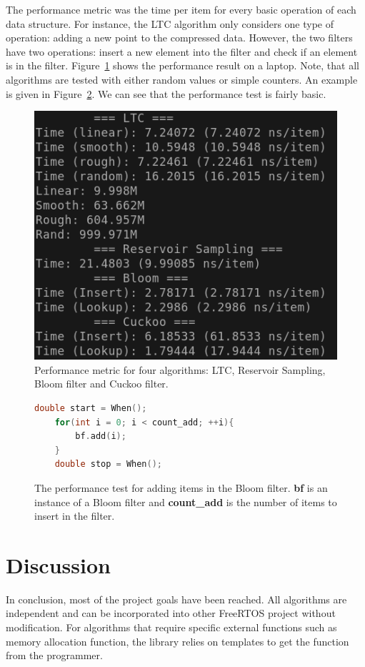 \documentclass{article}
\begin{document}
The performance metric was the time per item for every basic operation of each
data structure.  For instance, the LTC algorithm only considers one type of
operation: adding a new point to the compressed data.  However, the two filters
have two operations: insert a new element into the filter and check if an
element is in the filter.  Figure~\ref{fig:perf} shows the performance result
on a laptop.  Note, that all algorithms are tested with either random values or
simple counters.  An example is given in Figure~\ref{code:perf-bloom}.  We can
see that the performance test is fairly basic.
 
\begin{figure}
	\center
	\includegraphics[width=0.25\paperwidth]{perf.png}
	\caption{Performance metric for four algorithms: LTC, Reservoir Sampling, Bloom filter and Cuckoo filter.}
	\label{fig:perf}
\end{figure}

\begin{figure}[ht]
	\begin{lstlisting}[language=C++]
	double start = When();
	for(int i = 0; i < count_add; ++i){
		bf.add(i);
	}
	double stop = When();
	\end{lstlisting}
	\caption{The performance test for adding items in the Bloom filter.
	\textbf{bf} is an instance of a Bloom filter and \textbf{count\_add} is the
	number of items to insert in the filter.}
	\label{code:perf-bloom}
\end{figure} 

\clearpage
\section{Discussion}
In conclusion, most of the project goals have been reached.  All algorithms are
independent and can be incorporated into other FreeRTOS project without
modification.  For algorithms that require specific external functions such as
memory allocation function, the library relies on templates to get the function
from the programmer.
\end{document}
